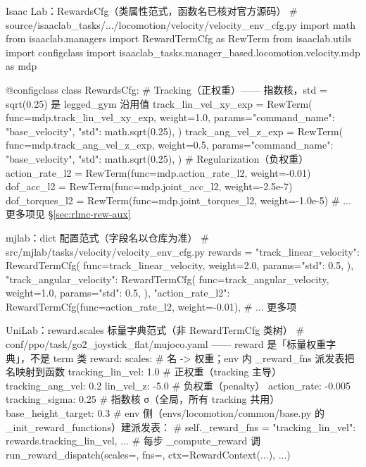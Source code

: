 \begin{codebox}[Python]{Isaac Lab：RewardsCfg（类属性范式，函数名已核对官方源码）}
# source/isaaclab_tasks/.../locomotion/velocity/velocity_env_cfg.py
import math
from isaaclab.managers import RewardTermCfg as RewTerm
from isaaclab.utils import configclass
import isaaclab_tasks.manager_based.locomotion.velocity.mdp as mdp

@configclass
class RewardsCfg:
    # Tracking（正权重）—— 指数核，std = sqrt(0.25) 是 legged_gym 沿用值
    track_lin_vel_xy_exp = RewTerm(
        func=mdp.track_lin_vel_xy_exp, weight=1.0,
        params={"command_name": "base_velocity", "std": math.sqrt(0.25)},
    )
    track_ang_vel_z_exp = RewTerm(
        func=mdp.track_ang_vel_z_exp, weight=0.5,
        params={"command_name": "base_velocity", "std": math.sqrt(0.25)},
    )
    # Regularization（负权重）
    action_rate_l2 = RewTerm(func=mdp.action_rate_l2, weight=-0.01)
    dof_acc_l2     = RewTerm(func=mdp.joint_acc_l2, weight=-2.5e-7)
    dof_torques_l2 = RewTerm(func=mdp.joint_torques_l2, weight=-1.0e-5)
    # ... 更多项见 §\ref{sec:rlmc-rew-aux}
\end{codebox}

\begin{codebox}[Python]{mjlab：dict 配置范式（字段名以仓库为准）}
# src/mjlab/tasks/velocity/velocity_env_cfg.py
rewards = {
    "track_linear_velocity": RewardTermCfg(
        func=track_linear_velocity, weight=2.0, params={"std": 0.5},
    ),
    "track_angular_velocity": RewardTermCfg(
        func=track_angular_velocity, weight=1.0, params={"std": 0.5},
    ),
    "action_rate_l2": RewardTermCfg(func=action_rate_l2, weight=-0.01),
    # ... 更多项
}
\end{codebox}

\begin{codebox}[Python]{UniLab：reward.scales 标量字典范式（非 RewardTermCfg 类树）}
# conf/ppo/task/go2_joystick_flat/mujoco.yaml —— reward 是「标量权重字典」，不是 term 类
reward:
  scales:                            # 名 -> 权重；env 内 _reward_fns 派发表把名映射到函数
    tracking_lin_vel: 1.0            # 正权重（tracking 主导）
    tracking_ang_vel: 0.2
    lin_vel_z: -5.0                  # 负权重（penalty）
    action_rate: -0.005
  tracking_sigma: 0.25               # 指数核 σ（全局，所有 tracking 共用）
  base_height_target: 0.3
# env 侧（envs/locomotion/common/base.py 的 _init_reward_functions）建派发表：
#   self._reward_fns = {"tracking_lin_vel": rewards.tracking_lin_vel, ...}
# 每步 _compute_reward 调 run_reward_dispatch(scales=, fns=, ctx=RewardContext(...), ...)
\end{codebox}

